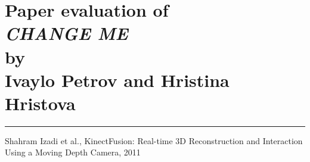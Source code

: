 \documentclass[12pt]{article}
\newcommand{\hr}{\rule{\linewidth}{0.1mm}}
\theoremstyle{plain}
\begin{document}


\section*{\centering
  Paper evaluation of\\
  \emph{CHANGE ME}\\
  by\\
  Ivaylo Petrov and Hristina Hristova
}

\hr

\cite{kinectfusion}


\begin{thebibliography}{widest entry}
   Shahram Izadi et al., KinectFusion: Real-time 3D
    Reconstruction and Interaction Using a Moving Depth Camera, 2011
\end{thebibliography}

\hfill\\
\end{document}
